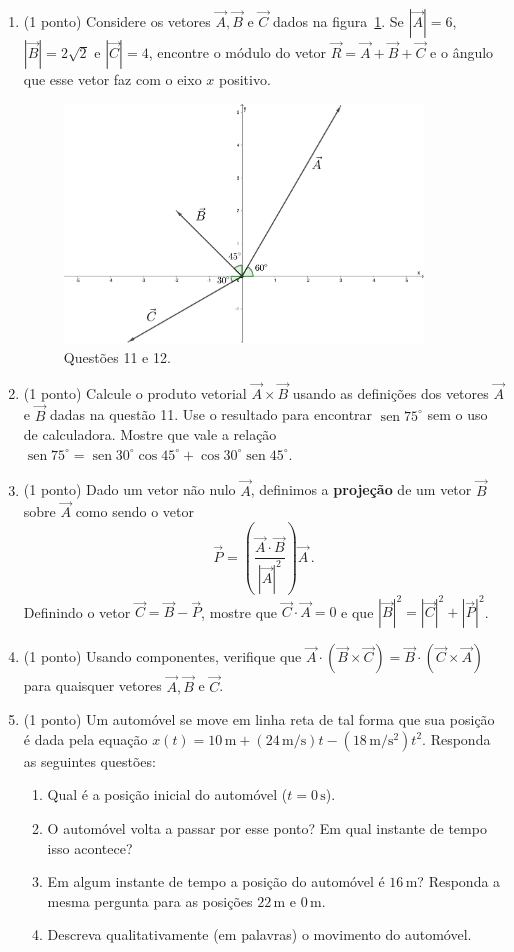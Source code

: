 \documentclass[12pt,a4paper]{article}
\newcommand{\dpar}[1]{\left(#1\right)}
\newcommand{\un}[1]{\mathrm{#1}}
\DeclareMathOperator{\sen}{sen}
\begin{document}
\begin{enumerate}
	\item (1 ponto) Considere os vetores $\vec A, \vec B$ e $\vec C$ dados na figura~\ref{fig}. Se $|\vec A|=6$, $|\vec B|=2\sqrt{2}$ e $|\vec C|=4$, encontre o módulo do vetor $\vec R=\vec A+\vec B+\vec C$ e o ângulo que esse vetor faz com o eixo $x$ positivo.
	\begin{figure}
		\centering
		\includegraphics[width=0.9\textwidth,keepaspectratio]{lista1-questao11}
		\caption{Questões 11 e 12.}
		\label{fig}
	\end{figure}
	\item (1 ponto) Calcule o produto vetorial $\vec A\times\vec B$ usando as definições dos vetores $\vec A$ e $\vec B$ dadas na questão 11. Use o resultado para encontrar $\sen 75^\circ$ sem o uso de calculadora. Mostre que vale a relação $\sen 75^\circ=\sen 30^\circ\cos 45^\circ+\cos 30^\circ\sen 45^\circ$.
	\item (1 ponto) Dado um vetor não nulo $\vec A$, definimos a \textbf{projeção} de um vetor $\vec B$ sobre $\vec A$ como sendo o vetor
	$$\vec P=\dpar{\frac{\vec A\cdot \vec B}{|\vec A|^2}}\vec A\,.$$
	Definindo o vetor $\vec C=\vec B-\vec P$, mostre que $\vec C\cdot\vec A=0$ e que $|\vec B|^2=|\vec C|^2+|\vec P|^2$.
	\item (1 ponto) Usando componentes, verifique que $\vec A\cdot(\vec B\times\vec C)=\vec B\cdot(\vec C\times \vec A)$ para quaisquer vetores $\vec A, \vec B$ e $\vec C$.
	\item (1 ponto) Um automóvel se move em linha reta de tal forma que sua posição é dada pela equação $x(t)=10\,\un{m}+(24\,\un{m}/\un{s})t-(18\,\un{m}/\un{s^2})t^2$. Responda as seguintes questões:
	\begin{enumerate}
		\item Qual é a posição inicial do automóvel ($t=0\,\un{s}$).
		\item O automóvel volta a passar por esse ponto? Em qual instante de tempo isso acontece?
		\item Em algum instante de tempo a posição do automóvel é $16\,\un{m}$? Res\-pon\-da a mesma pergunta para as posições $22\,\un{m}$ e $0\,\un{m}$.
		\item Descreva qualitativamente (em palavras) o movimento do automóvel.
	\end{enumerate}
\end{enumerate}
\end{document}
